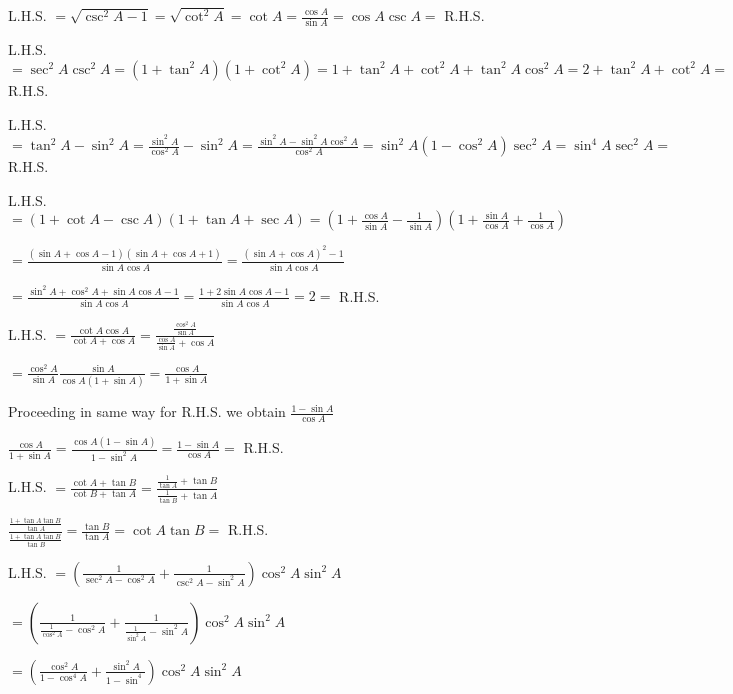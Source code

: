 \item L.H.S. $= \sqrt{\csc^2A - 1} = \sqrt{\cot^2A} = \cot A = \frac{\cos A}{\sin A} = \cos A \csc A =$ R.H.S.

\item L.H.S. $= \sec^2A\csc^2A = (1 + \tan^2A)(1 + \cot^2A) = 1 + \tan^2A + \cot^2A + \tan^2A\cos^2A = 2 + \tan^2A + \cot^2A
    =$ R.H.S.

\item L.H.S. $= \tan^2A - \sin^2A = \frac{\sin^2A}{\cos^2A} - \sin^2A = \frac{\sin^2A - \sin^2A\cos^2A}{\cos^2A} = \sin^2A(1 -
    \cos^2A)\sec^2A = \sin^4A\sec^2A =$ R.H.S.

\item L.H.S. $= (1 + \cot A - \csc A)(1 + \tan A + \sec A) = \left(1 + \frac{\cos A}{\sin A} - \frac{1}{\sin A}\right)\left(1
    + \frac{\sin A}{\cos A} + \frac{1}{\cos A}\right)$

    $= \frac{(\sin A + \cos A - 1)(\sin A + \cos A + 1)}{\sin A\cos A} = \frac{(\sin A + \cos A)^2 - 1}{\sin A\cos A}$

    $= \frac{\sin^2A + \cos^2A + \sin A\cos A - 1 }{\sin A\cos A} = \frac{1 + 2\sin A\cos A - 1}{\sin A\cos A} = 2=$ R.H.S.

\item L.H.S. $= \frac{\cot A\cos A}{\cot A + \cos A} = \frac{\frac{\cos^2 A}{\sin A}}{\frac{\cos A}{\sin A} + \cos A}$

    $= \frac{\cos^2A}{\sin A}{\frac{\sin A}{\cos A(1 + \sin A)}} = \frac{\cos A}{1 + \sin A}$

    Proceeding in same way for R.H.S. we obtain $\frac{1 - \sin A}{\cos A}$

    $\frac{\cos A}{1 + \sin A} = \frac{\cos A(1 - \sin A)}{1 - \sin^2A} = \frac{1 - \sin A}{\cos A} =$ R.H.S.

\item L.H.S. $= \frac{\cot A + \tan B}{\cot B + \tan A} = \frac{\frac{1}{\tan A} + \tan B}{\frac{1}{\tan B} + \tan A}$

    $\frac{\frac{1 + \tan A\tan B}{\tan A}}{\frac{1 + \tan A\tan B}{\tan B}} = \frac{\tan B}{\tan A} = \cot A\tan B =$ R.H.S.

\item L.H.S. $= \left(\frac{1}{\sec^2 A - \cos^2A} + \frac{1}{\csc^2A - \sin^2A}\right)\cos^2A\sin^2A$

    $= \left(\frac{1}{\frac{1}{\cos^2A} - \cos^2A} + \frac{1}{\frac{1}{\sin^2A} - \sin^2A}\right)\cos^2A\sin^2A$

    $= \left(\frac{\cos^2A}{1 - \cos^4A} + \frac{\sin^2A}{1 - \sin^4}\right)\cos^2A\sin^2A$

